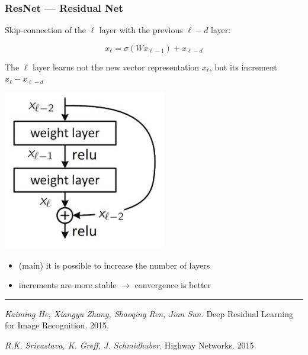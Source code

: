 \documentclass[fullscreen=true, bookmarks=true, hyperref={pdfencoding=unicode}]{beamer}
\begin{document}
\begin{frame}
\frametitle{ResNet — Residual Net}

   Skip-connection of the $\ell$ layer with the previous $\ell - d$ layer:

   $$ x_\ell = \sigma(Wx_{\ell-1}) + x_{\ell-d}$$

   The $\ell$ layer learns not the new vector representation $x_\ell$, but its increment $x_\ell - x_{\ell-d}$

   \begin{center}
     \includegraphics[keepaspectratio,
                      width=.3\paperwidth]{skip-connection.jpg}
   \end{center}


\end{frame}


\begin{frame}
  \begin{itemize}
     \item (main) it is possible to increase the number of layers
     \item increments are more stable $\to$ convergence is better
   \end{itemize}

  \vspace{1cm}
  \noindent\rule{8cm}{0.4pt}

  {\it Kaiming He, Xiangyu Zhang, Shaoqing Ren, Jian Sun.} Deep Residual Learning for Image Recognition. 2015.

  {\it R.K. Srivastava, K. Greff, J. Schmidhuber.} Highway Networks. 2015
\end{frame}
\end{document}
